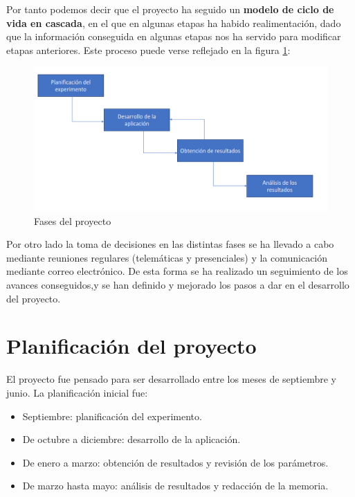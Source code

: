 \documentclass[a4paper,11pt, oneside]{book}
\begin{document}
Por tanto podemos decir que el proyecto ha seguido un \textbf{modelo de ciclo de vida en cascada}, en el que en algunas etapas ha habido realimentación, dado que la información conseguida en algunas etapas nos ha servido para modificar etapas anteriores. Este proceso puede verse reflejado en la figura \ref{fig:fases}:

\begin{figure}[H]
	
	\centering
	\includegraphics[width=\linewidth]{diagrama-fases}
	\caption{Fases del proyecto}
	\label{fig:fases}
	
\end{figure}

Por otro lado la toma de decisiones en las distintas fases se ha llevado a cabo mediante reuniones regulares (telemáticas y presenciales) y la comunicación mediante correo electrónico. De esta forma se ha realizado un seguimiento de los avances conseguidos,y se han definido y mejorado los pasos a dar en el desarrollo del proyecto. 


\section{Planificación del proyecto}
El proyecto fue pensado para ser desarrollado entre los meses de septiembre y junio. La planificación inicial fue:
\begin{itemize}
	\item Septiembre: planificación del experimento.
	\item De octubre a diciembre: desarrollo de la aplicación.
	\item De enero a marzo: obtención de resultados y revisión de los parámetros.
	\item De marzo hasta mayo: análisis de resultados y redacción de la memoria.
\end{itemize}
\end{document}
